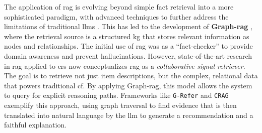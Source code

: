 The application of \ac{rag} is evolving beyond simple fact retrieval into a more sophisticated paradigm, with advanced techniques to further address the limitations of traditional \acp{llm} \cite{SOTA-ADVANCED-RAG}. This has led to the development of \textbf{Graph-\ac{rag}} \cite{GRAPHRAG-CRS}, where the retrieval source is a structured \ac{kg} that stores relevant information as nodes and relationships. The initial use of \ac{rag} was as a ``fact-checker'' to provide domain awareness and prevent hallucinations. However, state-of-the-art research in \ac{rag} applied to \ac{crs} now conceptualizes \ac{rag} as a \textit{collaborative signal retriever}. The goal is to retrieve not just item descriptions, but the complex, relational data that powers traditional \acl{cf}. By applying Graph-\ac{rag}, this model allows the system to query for explicit reasoning paths. Frameworks like \texttt{G-Refer} \cite{G-REFER} and \texttt{CRAG} \cite{COLLAB-LLM-CRS} exemplify this approach, using graph traversal to find evidence that is then translated into natural language by the \ac{llm} to generate a recommendation and a faithful explanation.